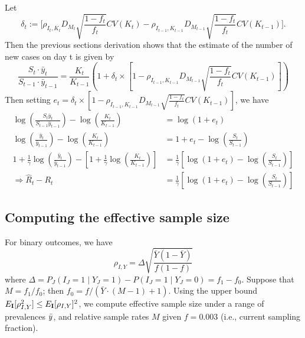 \documentclass[11pt]{amsart}
\numberwithin{equation}{section}
\theoremstyle{plain}
\def\I{\bf I}
\begin{document}
Let
$$
\delta_t := \bigg[ \rho_{I_t,K_t} D_{M_t} \sqrt{\frac{1-f_t}{f_t}} CV (K_t)  -\rho_{I_{t-1},K_{t-1}} D_{M_{t-1}} \sqrt{\frac{1-f_t}{f_t}} CV (K_{t-1}) \bigg].
$$
Then the previous sections derivation shows that the estimate of the number of new cases on day t is given by
$$
\frac{S_t \cdot \bar y_t}{S_{t-1} \cdot \bar y_{t-1}} =
\frac{K_t}{K_{t-1}} \left( 1 + \delta_t \times \left[ 1 - \rho_{I_{t-1},K_{t-1}} D_{M_{t-1}} \sqrt{\frac{1-f_t}{f_t}} CV (K_{t-1}) \right] \right)
$$
Then setting $e_t = \delta_t \times [1 - \rho_{I_{t-1},K_{t-1}} D_{M_{t-1}} \sqrt{\frac{1-f_t}{f_t}} CV (K_{t-1}) ]$, we have
$$
\begin{aligned}
\log \left( \frac{S_t \bar y_t}{S_{t-1} \bar y_{t-1}} \right) - \log \left( \frac{K_t}{K_{t-1}} \right) &= \log (1 + e_t) \\
\log \left( \frac{\bar y_t}{\bar y_{t-1}} \right) - \log \left( \frac{K_t}{K_{t-1}} \right) &= 1 + e_t - \log \left( \frac{S_t}{S_{t-1}} \right) \\
1 + \frac{1}{\gamma} \log \left( \frac{\bar y_t}{\bar y_{t-1}} \right) - \left[ 1 + \frac{1}{\gamma} \log \left( \frac{K_t}{K_{t-1}} \right) \right] &= \frac{1}{\gamma} \left[ \log \left( 1 + e_t \right) - \log \left( \frac{S_{t}}{S_{t-1}} \right) \right] \\
\Rightarrow \hat R_t - R_t &= \frac{1}{\gamma} \left[ \log \left( 1 + e_t \right) - \log \left( \frac{S_{t}}{S_{t-1}} \right) \right]
\end{aligned}
$$

\subsection{Computing the effective sample size}
\label{section:effss}

For binary outcomes, we have
\begin{equation} \label{eq:binaryrho}
\rho_{I,Y} = \Delta \sqrt{\frac{\bar Y (1 - \bar Y)}{f (1-f)} }
\end{equation}
where $\Delta = P_J (I_J = 1 \mid Y_J = 1) - P(I_J = 1 \mid Y_J = 0) = f_1 - f_0$.  Suppose that $M = f_1/f_0$; then $f_0 = f / (\bar Y \cdot (M-1) + 1)$.  Using the upper bound $E_{\I} [ \rho_{I,Y}^2 ] \leq E_{\I} [\rho_{I,Y} ]^2$, we compute effective sample size under a range of prevalences $\bar{y}$, and relative sample rates $M$ given $f = 0.003$ (i.e., current sampling fraction).
\end{document}
